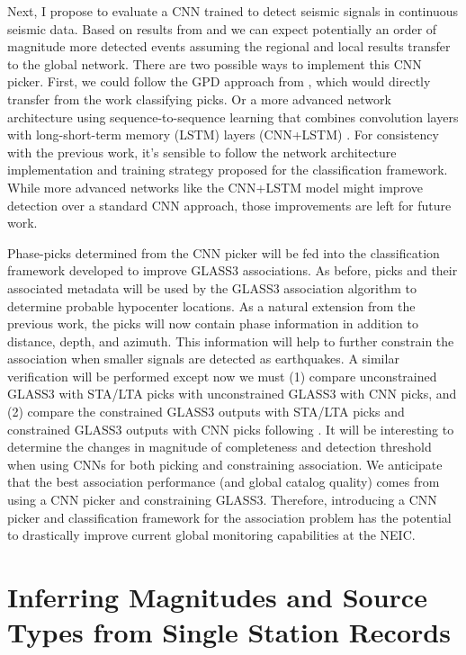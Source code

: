 \documentclass[12p]{article}
\begin{document}
Next, I propose to evaluate a CNN trained to detect seismic signals in continuous seismic data. Based on results from
\citet{Perol2018} and \citet{Ross2018b} we can expect potentially an order of magnitude more detected events assuming
the regional and local results transfer to the global network. There are two possible ways to implement this CNN picker.
First, we could follow the GPD approach from \citet{Ross2018b}, which would directly transfer from the work classifying
picks. Or a more advanced network architecture using sequence-to-sequence learning that combines convolution layers with
long-short-term memory (LSTM) layers (CNN+LSTM) \citep{Mousavi2019}. For consistency with the previous work, it's
sensible to follow the network architecture implementation and training strategy proposed for the classification
framework. While more advanced networks like the CNN+LSTM model might improve detection over a standard CNN approach,
those improvements are left for future work.

Phase-picks determined from the CNN picker will be fed into the classification framework developed to improve GLASS3
associations. As before, picks and their associated metadata will be used by the GLASS3 association algorithm to
determine probable hypocenter locations. As a natural extension from the previous work, the picks will now contain phase
information in addition to distance, depth, and azimuth. This information will help to further constrain the association
when smaller signals are detected as earthquakes. A similar verification will be performed except now we must (1)
compare unconstrained GLASS3 with STA/LTA picks with unconstrained GLASS3 with CNN picks, and (2) compare the
constrained GLASS3 outputs with STA/LTA picks and constrained GLASS3 outputs with CNN picks following \citet{Yeck2019}.
It will be interesting to determine the changes in magnitude of completeness and detection threshold when using CNNs for
both picking and constraining association. We anticipate that the best association performance (and global catalog
quality) comes from using a CNN picker and constraining GLASS3. Therefore, introducing a CNN picker and classification
framework for the association problem has the potential to drastically improve current global monitoring capabilities at
the NEIC.

\section{Inferring Magnitudes and Source Types from Single Station Records}
\end{document}
